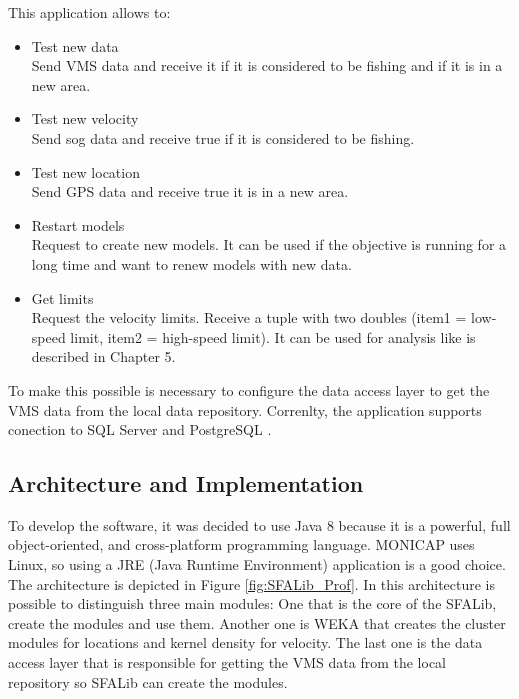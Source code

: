 This application allows to:
\begin{itemize}
\item Test new data \\ Send VMS data and receive it if it is considered to be fishing and if it is in a new area.
\item Test new velocity \\ Send sog data and receive true if it is considered to be fishing.
\item Test new location \\ Send GPS data and receive true it is in a new area.
\item Restart models \\ Request to create new models. It can be used if the objective is running for a long time and want to renew models with new data. 
\item Get limits \\ Request the velocity limits. Receive a tuple with two doubles (item1 = low-speed limit, item2 = high-speed limit). It can be used for analysis like is described in Chapter 5.
\end{itemize}

To make this possible is necessary to configure the data access layer to get the VMS data from the local data repository.
Correnlty, the application supports conection to SQL Server \cite{WEBSITE:SqlServer} and PostgreSQL \cite{WEBSITE:Postgresql}.




\subsection{Architecture and Implementation} %
\label{sub:architecturee_implementation}
To develop the software, it was decided to use Java 8 \cite{WEBSITE:OraJava8} because it is a powerful, full object-oriented, and cross-platform programming language. MONICAP uses Linux, so using a JRE (Java Runtime Environment) application is a good choice.
The architecture is depicted in Figure \ref{fig:SFALib_Prof}. In this architecture is possible to distinguish three main modules: One that is the core of the SFALib, create the modules and use them. Another one is WEKA \cite{WEBSITE:Weka} that creates the cluster modules for locations and kernel density for velocity. The last one is the data access layer that is responsible for getting the VMS data from the local repository so SFALib can create the modules.


